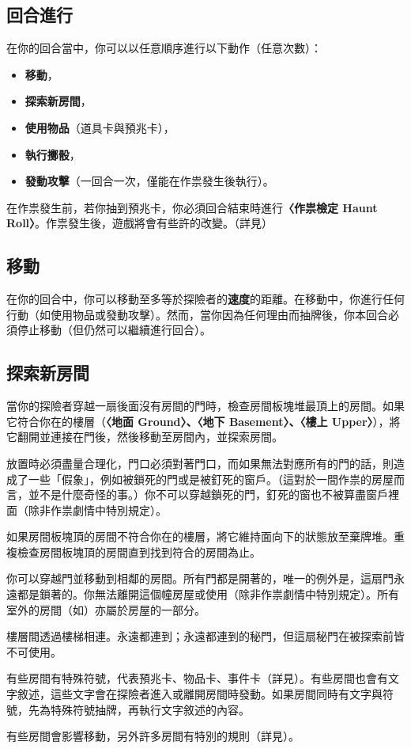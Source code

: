 \subsection{回合進行}
在你的回合當中，你可以以任意順序進行以下動作（任意次數）：\par
\begin{itemize}
  \item \textbf{移動}，
  \item \textbf{探索新房間}，
  \item \textbf{使用物品}（道具卡與預兆卡），
  \item \textbf{執行擲骰}，
  \item \textbf{發動攻擊}（一回合一次，僅能在作祟發生後執行）。
\end{itemize}
在作祟發生前，若你抽到預兆卡，你必須回合結束時進行\textbf{〈作祟檢定 Haunt Roll〉}。作祟發生後，遊戲將會有些許的改變。（詳見）

\subsection{移動}

在你的回合中，你可以移動至多等於探險者的\textbf{速度}的距離。在移動中，你進行任何行動（如使用物品或發動攻擊）。然而，當你因為任何理由而抽牌後，你本回合必須停止移動（但仍然可以繼續進行回合）。

\subsection{探索新房間}
當你的探險者穿越一扇後面沒有房間的門時，檢查房間板塊堆最頂上的房間。如果它符合你在的樓層（\textbf{〈地面 Ground〉、〈地下 Basement〉、〈樓上 Upper〉}），將它翻開並連接在門後，然後移動至房間內，並探索房間。\par
放置時必須盡量合理化，門口必須對著門口，而如果無法對應所有的門的話，則造成了一些「假象」，例如被鎖死的門或是被釘死的窗戶。（這對於一間作祟的房屋而言，並不是什麼奇怪的事。）你不可以穿越鎖死的門，釘死的窗也不被算盡窗戶裡面（除非作祟劇情中特別規定）。\par
如果房間板塊頂的房間不符合你在的樓層，將它維持面向下的狀態放至棄牌堆。重複檢查房間板塊頂的房間直到找到符合的房間為止。\par
你可以穿越門並移動到相鄰的房間。所有門都是開著的，唯一的例外是，這扇門永遠都是鎖著的。你無法離開這個幢房屋或使用（除非作祟劇情中特別規定）。所有室外的房間（如）亦屬於房屋的一部分。\par
樓層間透過樓梯相連。永遠都連到；永遠都連到的秘門，但這扇秘門在被探索前皆不可使用。\par
有些房間有特殊符號，代表預兆卡、物品卡、事件卡（詳見）。有些房間也會有文字敘述，這些文字會在探險者進入或離開房間時發動。如果房間同時有文字與符號，先為特殊符號抽牌，再執行文字敘述的內容。\par
有些房間會影響移動，另外許多房間有特別的規則（詳見）。


